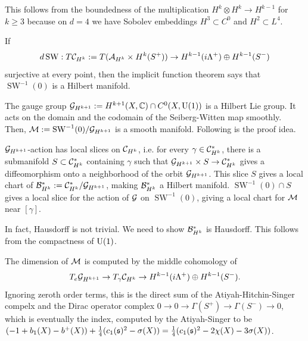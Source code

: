 \documentclass{../../../small}
\begin{document}
This follows from the boundedness of the multiplication $H^k\otimes H^k\to H^{k-1}$ for $k\ge3$ because on $d=4$ we have Sobolev embeddings $H^3\subset C^0$ and $H^2\subset L^4$.

If
\[d\operatorname{SW}:T\mathcal{C}_{H^k}:=T(\mathcal{A}_{H^k}\times H^k(S^+))\to H^{k-1}(i\Lambda^+)\oplus H^{k-1}(S^-)\]
surjective at every point, then the implicit function theorem says that $\operatorname{SW}^{-1}(0)$ is a Hilbert manifold.

The gauge group $\mathcal{G}_{H^{k+1}}:=H^{k+1}(X,\mathbb{C})\cap C^0(X,\mathrm{U}(1))$ is a Hilbert Lie group.
It acts on the domain and the codomain of the Seiberg-Witten map smoothly.
Then, $\mathcal{M}:=\operatorname{SW}^{-1}(0)/\mathcal{G}_{H^{k+1}}$ is a smooth manifold.
Following is the proof idea.

$\mathcal{G}_{H^{k+1}}$-action has local slices on $\mathcal{C}_{H^k}$, i.e. for every $\gamma\in\mathcal{C}_{H^k}^*$, there is a submanifold $S\subset\mathcal{C}_{H^k}^*$ containing $\gamma$ such that $\mathcal{G}_{H^{k+1}}\times S\to\mathcal{C}_{H^k}^*$ gives a diffeomorphism onto a neighborhood of the orbit $\mathcal{G}_{H^{k+1}}$.
This slice $S$ gives a local chart of $\mathcal{B}_{H^k}^*:=\mathcal{C}_{H^k}^*/\mathcal{G}_{H^{k+1}}$, making $\mathcal{B}_{H^k}^*$ a Hilbert manifold.
$\operatorname{SW}^{-1}(0)\cap S$ gives a local slice for the action of $\mathcal{G}$ on $\operatorname{SW}^{-1}(0)$, giving a local chart for $\mathcal{M}$ near $[\gamma]$.

In fact, Hausdorff is not trivial.
We need to show $\mathcal{B}_{H^k}^*$ is Hausdorff.
This follows from the compactness of $\mathrm{U}(1)$.


The dimension of $\mathcal{M}$ is computed by the middle cohomology of
\[T_e\mathcal{G}_{H^{k+1}}\to T_\gamma\mathcal{C}_{H^k}\to H^{k-1}(i\Lambda^+)\oplus H^{k-1}(S^-).\]
Ignoring zeroth order terms, this is the direct sum of the Atiyah-Hitchin-Singer compelx and the Dirac operator complex $0\to0\to\Gamma(S^+)\to\Gamma(S^-)\to0$, which is eventually the index, computed by the Atiyah-Singer to be $(-1+b_1(X)-b^+(X))+\frac14(c_1(\mathfrak{s})^2-\sigma(X))=\frac14(c_1(\mathfrak{s})^2-2\chi(X)-3\sigma(X))$.
\end{document}
